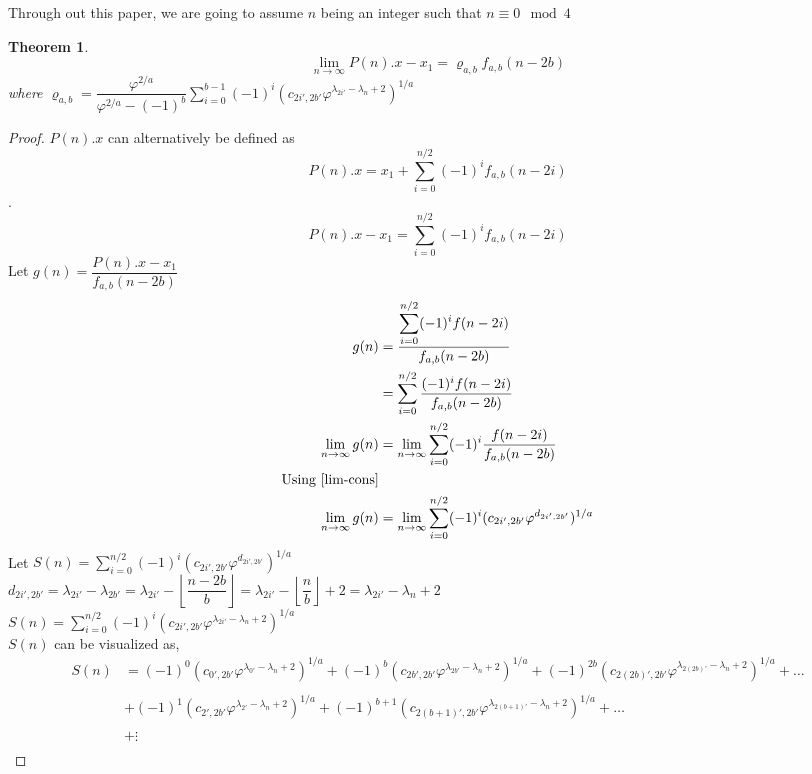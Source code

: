 \documentclass[preprint,12pt]{elsarticle}
\newtheorem{theorem}{Theorem}[section]
\begin{document}
Through out this paper, we are going to assume $n$ being an integer such that $n \equiv 0\mod4$
\begin{theorem}
	\label{lim-P}
	$$\lim_{n \to \infty} P(n).x - x_1 = \varrho_{a,b}f_{a,b}(n - 2b)$$
	where $\varrho_{a,b} = \dfrac{\varphi^{2/a}}{\varphi^{2/a} - (-1)^b}\displaystyle\sum_{i = 0}^{b - 1}(-1)^i (c_{2i', 2b'}\varphi^{\lambda_{2i'}-\lambda_{n}+2})^{1/a}$
\end{theorem}
\begin{proof}
	$P(n).x$ can alternatively be defined as $$P(n).x = x_1 + \sum_{i = 0}^{n / 2}(-1)^i f_{a,b}(n-2i)$$.
	$$P(n).x - x_1 = \sum_{i = 0}^{n / 2}(-1)^i f_{a,b}(n-2i)$$
	Let $g(n) = \dfrac{P(n).x - x_1}{f_{a,b}(n - 2b)}$
	\begin{align*}
	g(n) &= \dfrac{\displaystyle\sum_{i = 0}^{n / 2}(-1)^i f(n-2i)}{f_{a,b}(n - 2b)}\\
	&= \sum_{i = 0}^{n / 2}\dfrac{(-1)^i f(n-2i)}{f_{a,b}(n - 2b)}\\
	\lim_{n \to \infty}g(n) &= \lim_{n \to \infty}\sum_{i = 0}^{n / 2}(-1)^i \dfrac{f(n-2i)}{f_{a,b}(n - 2b)}\\
	\text{Using \ref{lim-cons}}\\
	\lim_{n \to \infty}g(n) &= \lim_{n \to \infty}\sum_{i = 0}^{n / 2}(-1)^i (c_{2i',2b'}\varphi^{d_{2i',2b'}})^{1/a}
	\end{align*}
	Let $S(n) = \displaystyle\sum_{i = 0}^{n/2}(-1)^i (c_{2i',2b'}\varphi^{d_{2i',2b'}})^{1/a}$\\
	$d_{2i',2b'} = \lambda_{2i'}-\lambda_{2b'}=\lambda_{2i'}-\left\lfloor\dfrac{n-2b}{b}\right\rfloor = \lambda_{2i'}- \left\lfloor\dfrac{n}{b}\right\rfloor + 2 = \lambda_{2i'}-\lambda_{n}+2$\\
	$S(n) = \displaystyle\sum_{i = 0}^{n/2}(-1)^i (c_{2i',2b'}\varphi^{\lambda_{2i'}-\lambda_{n}+2})^{1/a}$\\
	$S(n)$ can be visualized as,\\
	\begin{align*}
		S(n) &= (-1)^0(c_{0',2b'}\varphi^{\lambda_{0'}-\lambda_{n}+2})^{1/a}+(-1)^{b}(c_{2b',2b'}\varphi^{\lambda_{2b'}-\lambda_{n}+2})^{1/a}+(-1)^{2b}(c_{2(2b)',2b'}\varphi^{\lambda_{2(2b)'}-\lambda_{n}+2})^{1/a}+\ldots\\\\
		&+(-1)^1(c_{2',2b'}\varphi^{\lambda_{2'}-\lambda_{n}+2})^{1/a}+(-1)^{b+1}(c_{2(b+1)',2b'}\varphi^{\lambda_{2(b+1)'}-\lambda_{n}+2})^{1/a}+\ldots\\\\
		&+\vdots\\

\end{align*}
\end{proof}
\end{document}

